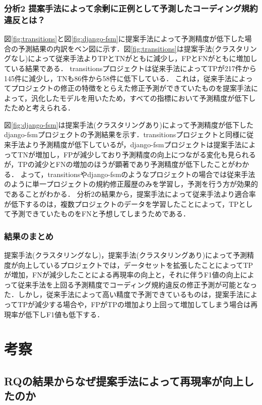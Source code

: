 \documentclass[11pt,dvipdfmx]{jreport}
\begin{document}
\subsection*{分析2 提案手法によって余剰に正例として予測したコーディング規約違反とは？}

図\ref{fig:transitions}と図\ref{fig:django-fsm}に提案手法によって予測精度が低下した場合の予測結果の内訳をベン図に示す．図\ref{fig:transitions}は提案手法(クラスタリングなし)によって従来手法よりTPとTNがともに減少し，FPとFNがともに増加している結果である．
transitionsプロジェクトは従来手法によってTPが217件から145件に減少し，TNも86件から58件に低下している．
これは，従来手法によってプロジェクトの修正の特徴をとらえた修正予測ができていたものを提案手法によって，汎化したモデルを用いたため，すべての指標において予測精度が低下したためと考えられる．

図\ref{fig:django-fsm}は提案手法(クラスタリングあり)によって予測精度が低下したdjango-fsmプロジェクトの予測結果を示す．transitionsプロジェクトと同様に従来手法より予測精度が低下しているが，django-fsmプロジェクトは提案手法によってTNが増加し，FPが減少しており予測精度の向上につながる変化も見られるが，TPの減少とFNの増加のほうが顕著であり予測精度が低下したことがわかる．
よって，transitionsやdjango-fsmのようなプロジェクトの場合では従来手法のように単一プロジェクトの規約修正履歴のみを学習し，予測を行う方が効果的であることがわかる．
分析2の結果から，提案手法によって従来手法より適合率が低下するのは，複数プロジェクトのデータを学習したことによって，TPとして予測できていたものをFNと予想してしまうためである．

\subsection{結果のまとめ}

提案手法(クラスタリングなし)，提案手法(クラスタリングあり)によって予測精度が向上しているプロジェクトでは，データセットを拡張したことによってTPが増加，FNが減少したことによる再現率の向上と，それに伴うF1値の向上によって従来手法を上回る予測精度でコーディング規約違反の修正予測が可能となった．しかし，従来手法によって高い精度で予測できているものは，提案手法によってTPが減少する場合や，FPがTPの増加より上回って増加してしまう場合は再現率が低下しF1値も低下する．

\chapter{考察}\label{chap:consideration}

\section{RQの結果からなぜ提案手法によって再現率が向上したのか}\label{kosatu}
\end{document}
